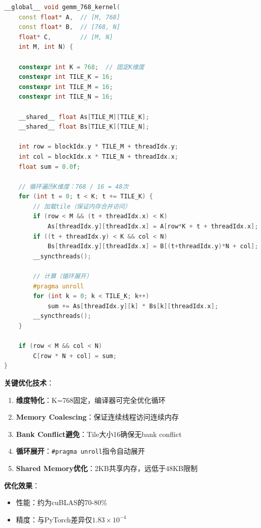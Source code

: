 \documentclass[12pt,a4paper]{article}
\begin{document}
\begin{lstlisting}[language=C++,caption=BERT特化GEMM Kernel]
__global__ void gemm_768_kernel(
    const float* A,  // [M, 768]
    const float* B,  // [768, N]
    float* C,        // [M, N]
    int M, int N) {
    
    constexpr int K = 768;  // 固定K维度
    constexpr int TILE_K = 16;
    constexpr int TILE_M = 16;
    constexpr int TILE_N = 16;
    
    __shared__ float As[TILE_M][TILE_K];
    __shared__ float Bs[TILE_K][TILE_N];
    
    int row = blockIdx.y * TILE_M + threadIdx.y;
    int col = blockIdx.x * TILE_N + threadIdx.x;
    float sum = 0.0f;
    
    // 循环遍历K维度：768 / 16 = 48次
    for (int t = 0; t < K; t += TILE_K) {
        // 加载tile（保证内存合并访问）
        if (row < M && (t + threadIdx.x) < K)
            As[threadIdx.y][threadIdx.x] = A[row*K + t + threadIdx.x];
        if ((t + threadIdx.y) < K && col < N)
            Bs[threadIdx.y][threadIdx.x] = B[(t+threadIdx.y)*N + col];
        __syncthreads();
        
        // 计算（循环展开）
        #pragma unroll
        for (int k = 0; k < TILE_K; k++)
            sum += As[threadIdx.y][k] * Bs[k][threadIdx.x];
        __syncthreads();
    }
    
    if (row < M && col < N)
        C[row * N + col] = sum;
}
\end{lstlisting}

\textbf{关键优化技术}：
\begin{enumerate}
    \item \textbf{维度特化}：K=768固定，编译器可完全优化循环
    \item \textbf{Memory Coalescing}：保证连续线程访问连续内存
    \item \textbf{Bank Conflict避免}：Tile大小16确保无bank conflict
    \item \textbf{循环展开}：\texttt{\#pragma unroll}指令自动展开
    \item \textbf{Shared Memory优化}：2KB共享内存，远低于48KB限制
\end{enumerate}

\textbf{优化效果}：
\begin{itemize}
    \item 性能：约为cuBLAS的70-80\%
    \item 精度：与PyTorch差异仅$1.83 \times 10^{-4}$
\end{itemize}
\end{document}
